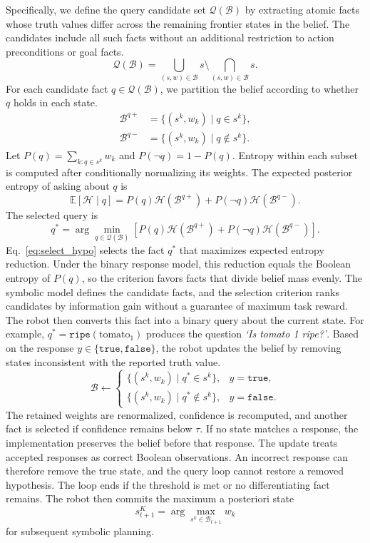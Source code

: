 Specifically, we define the query candidate set $\mathcal{Q}(\mathcal{B})$ by extracting atomic facts whose truth values differ across the remaining frontier states in the belief. The candidates include all such facts without an additional restriction to action preconditions or goal facts.
\[
\mathcal{Q}(\mathcal{B})
=
\bigcup_{(s,w)\in\mathcal{B}}s
\setminus
\bigcap_{(s,w)\in\mathcal{B}}s.
\]
For each candidate fact $q\in\mathcal{Q}(\mathcal{B})$, we partition the belief according to whether $q$ holds in each state.
\[
\begin{aligned}
\mathcal{B}^{q+}&=\{(s^k,w_k)\mid q\in s^k\},\\
\mathcal{B}^{q-}&=\{(s^k,w_k)\mid q\notin s^k\}.
\end{aligned}
\]
Let $P(q)=\sum_{k:q\in s^k}w_k$ and $P(\neg q)=1-P(q)$. Entropy within each subset is computed after conditionally normalizing its weights. The expected posterior entropy of asking about $q$ is
\[
\mathbb{E}[\mathcal{H}\mid q]
=
P(q)\mathcal{H}(\mathcal{B}^{q+})
+
P(\neg q)\mathcal{H}(\mathcal{B}^{q-}).
\]
The selected query is
\begin{equation}
q^*
=
\arg\min_{q\in\mathcal{Q}(\mathcal{B})}
\left[
P(q)\mathcal{H}(\mathcal{B}^{q+})
+
P(\neg q)\mathcal{H}(\mathcal{B}^{q-})
\right].
\label{eq:select_hypo}
\end{equation}
Eq.~\ref{eq:select_hypo} selects the fact $q^*$ that maximizes expected entropy reduction. Under the binary response model, this reduction equals the Boolean entropy of $P(q)$, so the criterion favors facts that divide belief mass evenly. The symbolic model defines the candidate facts, and the selection criterion ranks candidates by information gain without a guarantee of maximum task reward. The robot then converts this fact into a binary query about the current state. For example, $q^*=\texttt{ripe}(\text{tomato}_1)$ produces the question \textit{`Is tomato 1 ripe?'}. Based on the response $y\in\{\texttt{true},\texttt{false}\}$, the robot updates the belief by removing states inconsistent with the reported truth value.
\begin{equation}
\mathcal{B}
\leftarrow
\begin{cases}
\{(s^k,w_k)\mid q^*\in s^k\}, & y=\texttt{true},\\
\{(s^k,w_k)\mid q^*\notin s^k\}, & y=\texttt{false}.
\end{cases}
\label{eq:filter}
\end{equation}
The retained weights are renormalized, confidence is recomputed, and another fact is selected if confidence remains below $\tau$. If no state matches a response, the implementation preserves the belief before that response. The update treats accepted responses as correct Boolean observations. An incorrect response can therefore remove the true state, and the query loop cannot restore a removed hypothesis. The loop ends if the threshold is met or no differentiating fact remains. The robot then commits the maximum a posteriori state
\[
s_{t+1}^{K}
=
\arg\max_{s^k\in\mathcal{B}_{t+1}}w_k
\]
for subsequent symbolic planning.

